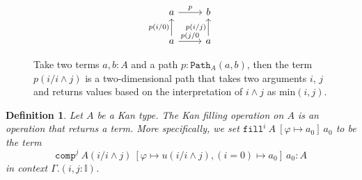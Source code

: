 \documentclass[12pt,a4paper,twoside,xetex]{book}
\newcommand{\keyword}[1]{\emph{#1}\index{#1}}
\newtheorem{definition}[theorem]{Definition}
\newcommand{\op}[1]{\mathtt{#1}}
\newcommand{\pa}[3]{\op{Path}_{#1}\left(#2, #3\right)}
\newcommand{\fillt}[5]{\op{fill}^{#1} \ {#2} \ \left[{#3} \mapsto {#5} \right] \ {#5}}
\begin{document}

% 
% 
%  
% 
%  
%  

% 
% 
% 
% 



\begin{figure}
\centering
\[ \begin{tikzcd}
a \arrow[r, "p" ] 
& b  \\
a 	\arrow[u, "p(i/0)"]	
	\arrow[r, "p(j/0"]
& a  \arrow[u, "p(i/j)"] 
\end{tikzcd}
\]
\caption{Take two terms $a,b:A$ and a path $p : \pa{A}{a}{b}$, then the term $p(i/i\wedge j)$ is a two-dimensional path that takes two arguments $i$, $j$ and returns values based on the interpretation of $i \wedge j$ as $\text{min}(i,j)$.}
\end{figure}


\begin{definition}\label{filldef}
Let $A$ be a Kan type. The Kan \keyword{filling} operation on $A$ is an operation that returns a term. More specifically, we set $\fillt{i}{A}{\varphi}{u}{a_0}$ to be the term $$\op{comp}^j \ A(i/i \wedge j) \ \left[\varphi \mapsto u(i/i \wedge j), (i=0) \mapsto a_0 \right] \ a_0 : A $$ in context $\Gamma . (i, j: \mathbb{I})$.
\end{definition}
\end{document}
